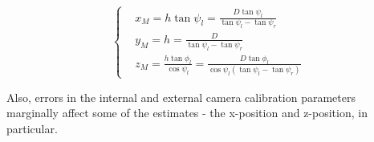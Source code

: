 \begin{equation}
	\left \{
	\begin{aligned}
		&x_M = h \tan \psi_l = \frac{D\tan \psi_l}{\tan \psi_l - \tan \psi_r}            \\
		&y_M = h = \frac{D}{\tan \psi_l - \tan \psi_r} \\
		&z_M = \frac{h\tan \phi_l}{\cos \psi_l} = \frac{D\tan \phi_l}{\cos \psi_l(\tan \psi_l - \tan \psi_r)}
	\end{aligned} \right.
	\label{eq:M_Positon_Equation}
\end{equation} 


Also, errors in the internal and external camera calibration parameters marginally affect some of the estimates - the x-position and z-position, in particular.

